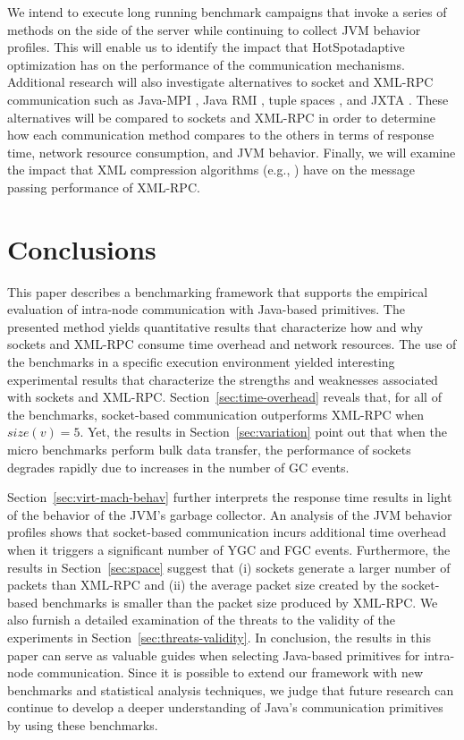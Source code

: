 \documentclass{sig-alternate}
\begin{document}
We intend to execute long running benchmark campaigns that invoke a
series of methods on the side of the server while continuing to
collect JVM behavior profiles.  This will enable us to identify the
impact that HotSpot\texttrademark adaptive optimization has on the
performance of the communication mechanisms.  Additional research will
also investigate alternatives to socket and XML-RPC communication such
as Java-MPI \cite{getov-mpi,judd-mpi-java}, Java RMI
\cite{grosso-rmi,maasen-java-rmi}, tuple spaces
\cite{arnold-javaspace-rdb,fiedler-per,wells-linda-java-journal}, and
JXTA \cite{oaks-jxta,seigneur-jxta}.  These alternatives will be
compared to sockets and XML-RPC in order to determine how each
communication method compares to the others in terms of response time,
network resource consumption, and JVM behavior. Finally, we will
examine the impact that XML compression algorithms (e.g.,
\cite{min-xpress}) have on the message passing performance of XML-RPC.

\section{Conclusions}
\label{sec:conclusions}

This paper describes a benchmarking framework that supports the
empirical evaluation of intra-node communication with Java-based
primitives.  The presented method yields quantitative results that
characterize how and why sockets and XML-RPC consume time overhead and
network resources.  The use of the benchmarks in a specific execution
environment yielded interesting experimental results that characterize
the strengths and weaknesses associated with sockets and XML-RPC.
Section~\ref{sec:time-overhead} reveals that, for all of the
benchmarks, socket-based communication outperforms XML-RPC when
$size(v)=5$.  Yet, the results in Section~\ref{sec:variation} point
out that when the micro benchmarks perform bulk data transfer, the
performance of sockets degrades rapidly due to increases in the number
of GC events.

Section~\ref{sec:virt-mach-behav} further interprets the response time
results in light of the behavior of the JVM's garbage collector.  An
analysis of the JVM behavior profiles shows that socket-based
communication incurs additional time overhead when it triggers a
significant number of YGC and FGC events.  Furthermore, the results in
Section~\ref{sec:space} suggest that (i) sockets generate a larger
number of packets than XML-RPC and (ii) the average packet size
created by the socket-based benchmarks is smaller than the packet size
produced by XML-RPC.  We also furnish a detailed examination of the
threats to the validity of the experiments in
Section~\ref{sec:threats-validity}.  In conclusion, the results in
this paper can serve as valuable guides when selecting Java-based
primitives for intra-node communication.  Since it is possible to
extend our framework with new benchmarks and statistical analysis
techniques, we judge that future research can continue to develop a
deeper understanding of Java's communication primitives by using these
benchmarks.
\end{document}
